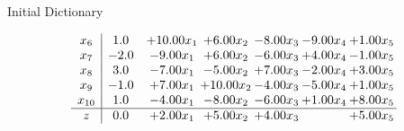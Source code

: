 \documentclass[8pt]{article}
\begin{document}
Initial Dictionary 

\[\begin{array}{c| c c@{\hskip 2pt} c@{\hskip 2pt} c@{\hskip 2pt} c@{\hskip 2pt} c@{\hskip 2pt} }
 x_{6}   &  1.0 & + 10.00 x_{1} & +  6.00 x_{2} & -8.00 x_{3} & -9.00 x_{4} & +  1.00 x_{5}\\
 x_{7}   &  -2.0 & -9.00 x_{1} & +  6.00 x_{2} & -6.00 x_{3} & +  4.00 x_{4} & -1.00 x_{5}\\
 x_{8}   &  3.0 & -7.00 x_{1} & -5.00 x_{2} & +  7.00 x_{3} & -2.00 x_{4} & +  3.00 x_{5}\\
 x_{9}   &  -1.0 & +  7.00 x_{1} & + 10.00 x_{2} & -4.00 x_{3} & -5.00 x_{4} & +  1.00 x_{5}\\
 x_{10}   &  1.0 & -4.00 x_{1} & -8.00 x_{2} & -6.00 x_{3} & +  1.00 x_{4} & +  8.00 x_{5}\\
\hline
z    &  0.0 & +  2.00 x_{1} & +  5.00 x_{2} & +  4.00 x_{3} &   & +  5.00 x_{5}\\
\end{array}\]
\end{document}
